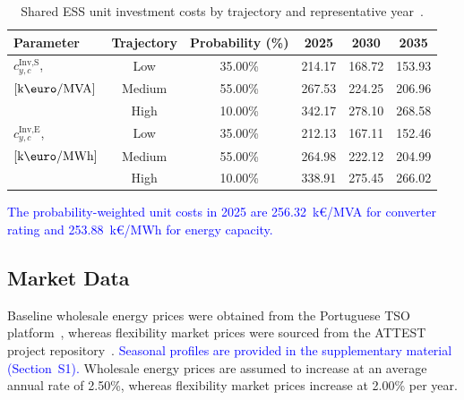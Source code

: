 \documentclass[preprint,12pt]{elsarticle}
\begin{document}
\begin{table}[htbp!]
    \centering    
    \caption{Shared ESS unit investment costs by trajectory and representative year~\cite{nrel_ess_costs}.}
    \begin{tabular}{lcc ccc}
        \toprule
        Parameter & Trajectory & Probability (\%) & 2025 & 2030 & 2035 \\
        \midrule
        $c^\text{Inv,S}_{y,c}$,             & Low       & 35.00\% & 214.17 & 168.72 & 153.93\\
        $\left[\text{k\euro/MVA}\right]$    & Medium    & 55.00\% & 267.53 & 224.25 & 206.96\\
        ~                                   & High      & 10.00\% & 342.17 & 278.10 & 268.58\\
        \midrule
        $c^\text{Inv,E}_{y,c}$,             & Low       & 35.00\% & 212.13 & 167.11 & 152.46\\
        $\left[\text{k\euro/MWh}\right]$    & Medium    & 55.00\% & 264.98 & 222.12 & 204.99\\
        ~                                   & High      & 10.00\% & 338.91 & 275.45 & 266.02\\
        \bottomrule
    \end{tabular}
    \label{tab:investment_cost}
\end{table}


\textcolor{blue}{
    The probability-weighted unit costs in 2025 are 256.32~k\euro{}/MVA for converter rating and 253.88~k\euro{}/MWh for energy capacity.
}

\subsection{Market Data}

Baseline wholesale energy prices were obtained from the Portuguese TSO platform~\cite{ren_market_platform}, whereas flexibility market prices were sourced from the ATTEST project repository~\cite{attest_project_repo}. \textcolor{blue}{Seasonal profiles are provided in the supplementary material (Section~S1).} Wholesale energy prices are assumed to increase at an average annual rate of 2.50\%, whereas flexibility market prices increase at 2.00\% per year.
\end{document}
